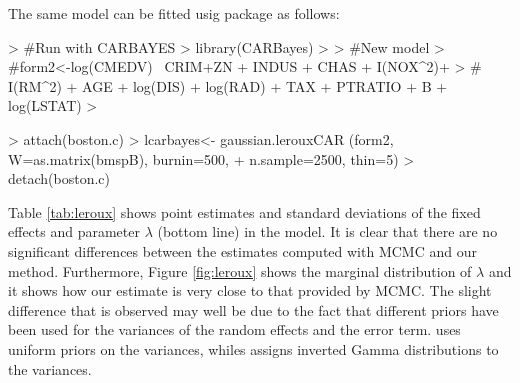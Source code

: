 \documentclass[article]{jss}
\begin{document}
The same model can be fitted usig package \citep{CARBayes:2013}
as follows:

\begin{Schunk}
\begin{Sinput}
> #Run with CARBAYES
> library(CARBayes)
> 
> #New model
> #form2<-log(CMEDV) ~CRIM+ZN + INDUS + CHAS + I(NOX^2)+
> #   I(RM^2) +  AGE + log(DIS) + log(RAD) + TAX + PTRATIO + B + log(LSTAT)
> 
\end{Sinput}
\end{Schunk}
\begin{Schunk}
\begin{Sinput}
> attach(boston.c)
> lcarbayes<- gaussian.lerouxCAR (form2, W=as.matrix(bmspB), burnin=500, 
+    n.sample=2500, thin=5)
> detach(boston.c)
\end{Sinput}
\end{Schunk}


Table \ref{tab:leroux} shows point estimates and standard deviations of the
fixed effects and parameter $\lambda$ (bottom line) in the model. It is clear
that there are no significant differences between the estimates computed with
MCMC and our method.  Furthermore, Figure \ref{fig:leroux} shows the marginal
distribution of $\lambda$ and it shows how our estimate is very close to that
provided by MCMC. The slight difference that is observed may well be due to the
fact that different priors have been used for the variances of the random
effects and the error term.  uses uniform priors on the variances,
whiles  assigns inverted Gamma distributions to the variances.
\end{document}

